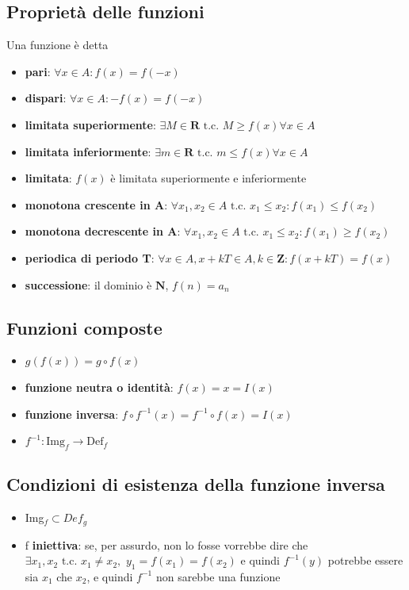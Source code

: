 \documentclass{report}
\begin{document}
    \subsection{Proprietà delle funzioni}
        Una funzione è detta
        \begin{itemize}
            \item \textbf{pari}: $\forall x \in A: f(x) = f(-x)$
            \item \textbf{dispari}: $\forall x \in A: -f(x) = f(-x)$
            \item \textbf{limitata superiormente}: $\exists M \in \mathbf{R} 
                \textrm{ t.c. } M \geq f(x) \forall x \in A$
            \item \textbf{limitata inferiormente}: $\exists m \in \mathbf{R} 
                \textrm{ t.c. } m \leq f(x) \forall x \in A$
            \item \textbf{limitata}: $f(x)$ è limitata superiormente e inferiormente
            \item \textbf{monotona crescente in A}: $\forall x_1, x_2 \in A \textrm{ t.c. } 
                x_1 \leq x_2: f(x_1) \leq f(x_2)$
            \item \textbf{monotona decrescente in A}: $\forall x_1, x_2 \in A \textrm{ t.c. } 
                x_1 \leq x_2: f(x_1) \geq f(x_2)$
            \item \textbf{periodica di periodo T}: $\forall x \in A, x + kT \in A, 
                k \in \mathbf{Z}: f(x + kT) = f(x)$
            \item \textbf{successione}: il dominio è $\mathbf{N}$, $f(n) = a_n$
        \end{itemize}
    \subsection{Funzioni composte}
    \begin{itemize}
        \item $g(f(x)) = g \circ f(x)$
        \item \textbf{funzione neutra o identità}: $f(x) = x = I(x)$
        \item \textbf{funzione inversa}: $f \circ f^{-1}(x) = f^{-1} \circ f(x) = I(x)$
        \item $f^{-1}: \textrm{Img}_f \rightarrow \textrm{Def}_f$
    \end{itemize}
        \subsection{Condizioni di esistenza della funzione inversa}
            \begin{itemize}
                \item Img$_f \subset Def_g$ 
                \item f \textbf{iniettiva}: se, per assurdo, non lo fosse vorrebbe dire 
                    che $\exists x_1,x_2 \textrm{ t.c. } x_1 \neq x_2, \, \, y_1 = f(x_1) = f(x_2)$ e quindi
                    $f^{-1}(y)$ potrebbe essere sia $x_1$ che $x_2$, e quindi $f^{-1}$
                    non sarebbe una funzione
            \end{itemize}
\end{document}
